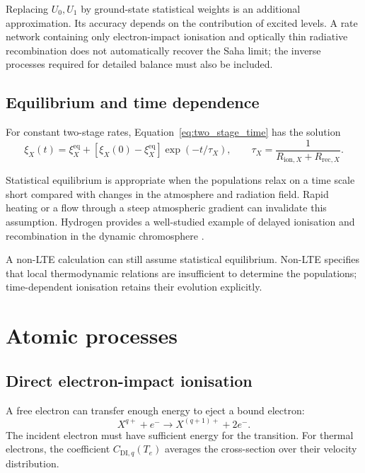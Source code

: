 \documentclass[a4paper,10pt,twoside,openany]{book}
\newcommand{\ChapColor}{Cap1Blue}
\newcommand{\ChapColorLight}{LightBlue}
\newcommand{\setChapColor}[2]{%
  \renewcommand{\ChapColor}{#1}%
  \renewcommand{\ChapColorLight}{#2}}
\numberwithin{equation}{chapter}
\begin{document}
Replacing $U_0,U_1$ by ground-state statistical weights is an
additional approximation. Its accuracy depends on the contribution
of excited levels. A rate network containing only electron-impact
ionisation and optically thin radiative recombination does not
automatically recover the Saha limit; the inverse processes required
for detailed balance must also be included.

\section{Equilibrium and time dependence}
For constant two-stage rates, Equation~\eqref{eq:two_stage_time} has
the solution
\begin{equation}
  \xi_X(t)=\xi_X^{\mathrm{eq}}
  +[\xi_X(0)-\xi_X^{\mathrm{eq}}]\exp(-t/\tau_X),
  \qquad
  \tau_X=\frac{1}{R_{\mathrm{ion},X}+R_{\mathrm{rec},X}}.
\end{equation}

Statistical equilibrium is appropriate when the populations relax
on a time scale short compared with changes in the atmosphere and
radiation field. Rapid heating or a flow through a steep atmospheric
gradient can invalidate this assumption. Hydrogen provides a
well-studied example of delayed ionisation and recombination in
the dynamic chromosphere \cite{CarlssonStein2002}.

A non-LTE calculation can still assume statistical equilibrium.
Non-LTE specifies that local thermodynamic relations are
insufficient to determine the populations; time-dependent
ionisation retains their evolution explicitly.

\setChapColor{Cap2Orange}{LightOrange}
\chapter{Atomic processes}

\section{Direct electron-impact ionisation}
A free electron can transfer enough energy to eject a bound
electron:
\begin{equation}
  X^{q+}+e^-\longrightarrow X^{(q+1)+}+2e^-.
\end{equation}
The incident electron must have sufficient energy for the transition.
For thermal electrons, the coefficient $C_{\mathrm{DI},q}(T_e)$
averages the cross-section over their velocity distribution.
\end{document}

